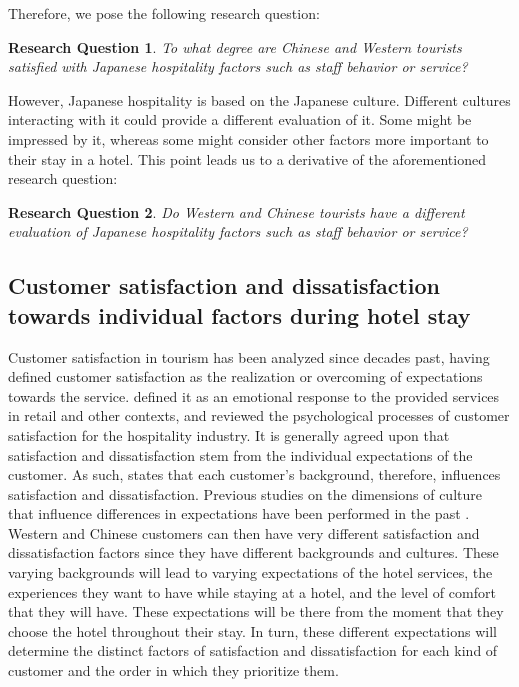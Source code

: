 \documentclass[smallextended,natbib]{svjour3}       %
\makeatletter
\newtheorem{rsq}{Research Question}
\newcounter{subrsq}
\newenvironment{subrsq}
         {%
          \setcounter{subrsq}{0}%
          \stepcounter{rsq}%
          \edef\saved@rsq{\thersq}%
          \let\c@rsq\c@subrsq     %
          \renewcommand{\thersq}{\saved@rsq\alph{rsq}}%
         }
         {}
\makeatother
\begin{document}
    Therefore, we pose the following research question:

    \begin{subrsq}
    \begin{rsq}
    \label{rsq:hospitality}
    To what degree are Chinese and Western tourists satisfied with Japanese hospitality factors such as staff behavior or service?
    \end{rsq}

    However, Japanese hospitality is based on the Japanese culture. Different cultures interacting with it could provide a different evaluation of it. Some might be impressed by it, whereas some might consider other factors more important to their stay in a hotel. This point leads us to a derivative of the aforementioned research question:

    \begin{rsq}
    \label{rsq:hospitality_both}
    Do Western and Chinese tourists have a different evaluation of Japanese hospitality factors such as staff behavior or service?
    \end{rsq}
    \end{subrsq}

  \subsection{Customer satisfaction and dissatisfaction towards individual factors during hotel stay}\label{theory_satisfaction}

    Customer satisfaction in tourism has been analyzed since decades past, \cite{hunt1975} having defined customer satisfaction as the realization or overcoming of expectations towards the service. \cite{oliver1981} defined it as an emotional response to the provided services in retail and other contexts, and \cite{oh1996} reviewed the psychological processes of customer satisfaction for the hospitality industry. It is generally agreed upon that satisfaction and dissatisfaction stem from the individual expectations of the customer. As such, \cite{engel1990} states that each customer's background, therefore, influences satisfaction and dissatisfaction. Previous studies on the dimensions of culture that influence differences in expectations have been performed in the past \cite{donthu1998cultural}. Western and Chinese customers can then have very different satisfaction and dissatisfaction factors since they have different backgrounds and cultures. These varying backgrounds will lead to varying expectations of the hotel services, the experiences they want to have while staying at a hotel, and the level of comfort that they will have. These expectations will be there from the moment that they choose the hotel throughout their stay. In turn, these different expectations will determine the distinct factors of satisfaction and dissatisfaction for each kind of customer and the order in which they prioritize them. 
\end{document}
